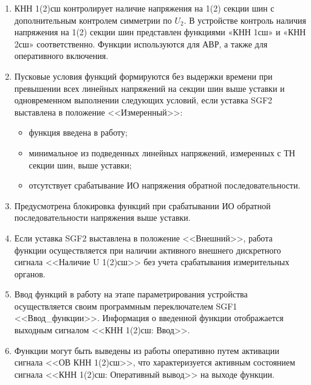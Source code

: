 
\color{black}

\begin{enumerate}

\item
КНН 1(2)сш контролирует наличие напряжения на 1(2) секции шин с дополнительным контролем симметрии по $U_2$. В устройстве контроль наличия напряжения на 1(2) секции шин представлен функциями «КНН 1сш» и «КНН 2сш» соответственно. Функции используются для АВР, а также для оперативного включения.

\item
Пусковые условия функций формируются без выдержки времени при превышении всех линейных напряжений на секции шин выше уставки и одновременном выполнении следующих условий, если уставка SGF2 выставлена в положение <<Измеренный>>:
\begin{itemize}
    \item функция введена в работу;
    \item минимальное из подведенных линейных напряжений, измеренных с ТН секции шин, выше уставки;
    \item отсутствует срабатывание ИО напряжения обратной последовательности.
\end{itemize}
\item
Предусмотрена блокировка функций при срабатывании ИО обратной последовательности напряжения выше уставки.

\item
Если уставка SGF2 выставлена в положение <<Внешний>>, работа функции осуществляется при наличии активного внешнего дискретного сигнала <<Наличие U 1(2)сш>> без учета срабатывания измерительных органов.

\item
Ввод функций в работу на этапе параметрирования устройства осуществляется своим программным переключателем SGF1 <<Ввод\_функции>>. Информация о введенной функции отображается выходным сигналом <<КНН 1(2)сш: Ввод>>.

\item
Функции могут быть выведены из работы оперативно путем активации сигнала <<ОВ КНН 1(2)сш>>, что характеризуется активным состоянием сигнала <<КНН 1(2)сш: Оперативный вывод>> на выходе функции.


\end{enumerate}
